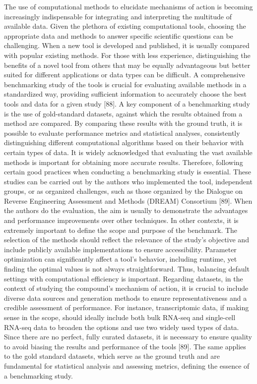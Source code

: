 The use of computational methods to elucidate mechanisms of action is becoming increasingly indispensable for integrating and interpreting the multitude of available data. Given the plethora of existing computational tools, choosing the appropriate data and methods to answer specific scientific questions can be challenging. When a new tool is developed and published, it is usually compared with popular existing methods. For those with less experience, distinguishing the benefits of a novel tool from others that may be equally advantageous but better suited for different applications or data types can be difficult. 
A comprehensive benchmarking study of the tools is crucial for evaluating available methods in a standardized way, providing sufficient information to accurately choose the best tools and data for a given study [88]. A key component of a benchmarking study is the use of gold-standard datasets, against which the results obtained from a method are compared. By comparing these results with the ground truth, it is possible to evaluate performance metrics and statistical analyses, consistently distinguishing different computational algorithms based on their behavior with certain types of data. It is widely acknowledged that evaluating the vast available methods is important for obtaining more accurate results. Therefore, following certain good practices when conducting a benchmarking study is essential. These studies can be carried out by the authors who implemented the tool, independent groups, or as organized challenges, such as those organized by the Dialogue on Reverse Engineering Assessment and Methods (DREAM) Consortium [89]. When the authors do the evaluation, the aim is usually to demonstrate the advantages and performance improvements over other techniques. In other contexts, it is extremely important to define the scope and purpose of the benchmark. The selection of the methods should reflect the relevance of the study’s objective and include publicly available implementations to ensure accessibility. Parameter optimization can significantly affect a tool's behavior, including runtime, yet finding the optimal values is not always straightforward. Thus, balancing default settings with computational efficiency is important. Regarding datasets, in the context of studying the compound’s mechanism of action, it is crucial to include diverse data sources and generation methods to ensure representativeness and a credible assessment of performance. For instance, transcriptomic data, if making sense in the scope, should ideally include both bulk RNA-seq and single-cell RNA-seq data to broaden the options and use two widely used types of data. Since there are no perfect, fully curated datasets, it is necessary to ensure quality to avoid biasing the results and performance of the tools [89]. The same applies to the gold standard datasets, which serve as the ground truth and are fundamental for statistical analysis and assessing metrics, defining the essence of a benchmarking study.
